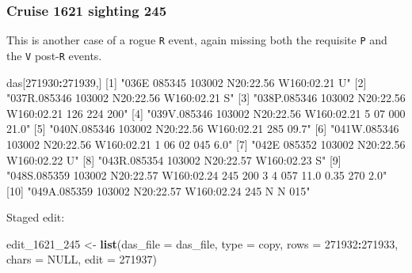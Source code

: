 \documentclass[
]{book}
\newenvironment{Shaded}{\begin{snugshade}}{\end{snugshade}}
\newcommand{\AttributeTok}[1]{\textcolor[rgb]{0.13,0.29,0.53}{#1}}
\newcommand{\ConstantTok}[1]{\textcolor[rgb]{0.56,0.35,0.01}{#1}}
\newcommand{\DecValTok}[1]{\textcolor[rgb]{0.00,0.00,0.81}{#1}}
\newcommand{\FunctionTok}[1]{\textcolor[rgb]{0.13,0.29,0.53}{\textbf{#1}}}
\newcommand{\NormalTok}[1]{#1}
\newcommand{\OtherTok}[1]{\textcolor[rgb]{0.56,0.35,0.01}{#1}}
\newcommand{\SpecialCharTok}[1]{\textcolor[rgb]{0.81,0.36,0.00}{\textbf{#1}}}
\newcommand{\StringTok}[1]{\textcolor[rgb]{0.31,0.60,0.02}{#1}}
\begin{document}
\hypertarget{cruise-1621-sighting-245}{%
\subsubsection*{Cruise 1621 sighting 245}\label{cruise-1621-sighting-245}}

This is another case of a rogue \texttt{R} event, again missing both the requisite \texttt{P} and the \texttt{V} post-\texttt{R} events.

\begin{Shaded}
\begin{Highlighting}[]
\NormalTok{das[}\DecValTok{271930}\SpecialCharTok{:}\DecValTok{271939}\NormalTok{,] }
\NormalTok{ [}\DecValTok{1}\NormalTok{] }\StringTok{"036E 085345 103002 N20:22.56 W160:02.21    U"}                                        
\NormalTok{ [}\DecValTok{2}\NormalTok{] }\StringTok{"037R.085346 103002 N20:22.56 W160:02.21    S"}                                        
\NormalTok{ [}\DecValTok{3}\NormalTok{] }\StringTok{"038P.085346 103002 N20:22.56 W160:02.21  126  224  200"}                              
\NormalTok{ [}\DecValTok{4}\NormalTok{] }\StringTok{"039V.085346 103002 N20:22.56 W160:02.21    5   07  000      21.0"}                    
\NormalTok{ [}\DecValTok{5}\NormalTok{] }\StringTok{"040N.085346 103002 N20:22.56 W160:02.21  285 09.7"}                                   
\NormalTok{ [}\DecValTok{6}\NormalTok{] }\StringTok{"041W.085346 103002 N20:22.56 W160:02.21    1   06   02  045  6.0"}                    
\NormalTok{ [}\DecValTok{7}\NormalTok{] }\StringTok{"042E 085352 103002 N20:22.56 W160:02.22    U"}                                        
\NormalTok{ [}\DecValTok{8}\NormalTok{] }\StringTok{"043R.085354 103002 N20:22.57 W160:02.23    S"}                                        
\NormalTok{ [}\DecValTok{9}\NormalTok{] }\StringTok{"048S.085359 103002 N20:22.57 W160:02.24  245  200    3    4  057 11.0 0.35  270  2.0"}
\NormalTok{[}\DecValTok{10}\NormalTok{] }\StringTok{"049A.085359 103002 N20:22.57 W160:02.24  245         N    N  015"}                    
\end{Highlighting}
\end{Shaded}

Staged edit:

\begin{Shaded}
\begin{Highlighting}[]
\NormalTok{edit\_1621\_245 }\OtherTok{\textless{}{-}} 
  \FunctionTok{list}\NormalTok{(}\AttributeTok{das\_file =}\NormalTok{ das\_file, }
       \AttributeTok{type =} \StringTok{\textquotesingle{}copy\textquotesingle{}}\NormalTok{,}
       \AttributeTok{rows =} \DecValTok{271932}\SpecialCharTok{:}\DecValTok{271933}\NormalTok{,}
       \AttributeTok{chars =} \ConstantTok{NULL}\NormalTok{,}
       \AttributeTok{edit =} \DecValTok{271937}\NormalTok{)}
\end{Highlighting}
\end{Shaded}
\end{document}
